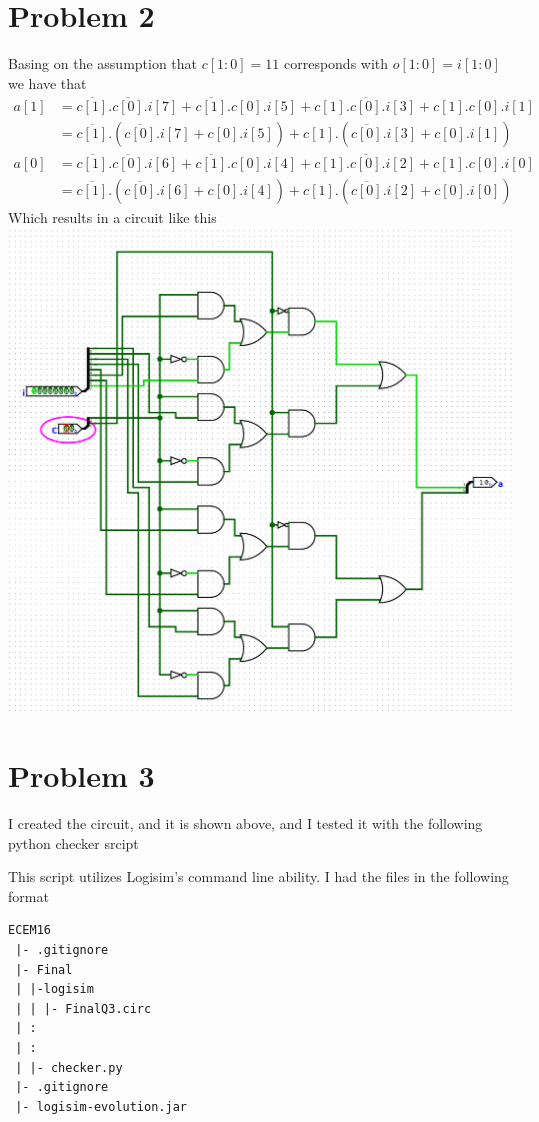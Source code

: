 \documentclass[12pt]{article}
\begin{document}
\section*{Problem 2}
Basing on the assumption that $c[1:0]=11$ corresponds with $o[1:0]=i[1:0]$
we have that 
\begin{align*}
    a[1]&=\overline{c[1]}.\overline{c[0]}.i[7]+\overline{c[1]}.c[0].i[5]+
        c[1].\overline{c[0]}.i[3]+c[1].c[0].i[1]\\
        &=\overline{c[1]}.(\overline{c[0]}.i[7]+c[0].i[5])+c[1].(\overline{c[0]}.i[3]+c[0].i[1])
\end{align*}
\begin{align*}
    a[0]&=\overline{c[1]}.\overline{c[0]}.i[6]+\overline{c[1]}.c[0].i[4]+
        c[1].\overline{c[0]}.i[2]+c[1].c[0].i[0]\\
        &=\overline{c[1]}.(\overline{c[0]}.i[6]+c[0].i[4])+c[1].(\overline{c[0]}.i[2]+c[0].i[0])
\end{align*}
Which results in a circuit like this\\
\includegraphics[scale=0.25]{fig1.png}
\section*{Problem 3}
I created the circuit, and it is shown above, and I tested it with the following python checker srcipt

This script utilizes Logisim's command line ability. I had the files in the following format
\begin{verbatim}
ECEM16
 |- .gitignore
 |- Final
 | |-logisim
 | | |- FinalQ3.circ
 | :
 | :
 | |- checker.py
 |- .gitignore
 |- logisim-evolution.jar
\end{verbatim}
\end{document}
